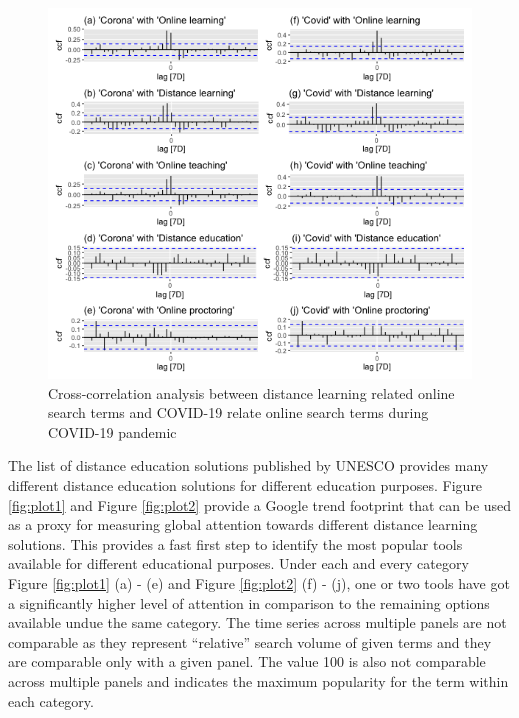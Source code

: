\documentclass[11pt,a4paper,]{article}
\begin{document}
\begin{figure}[h]

{\centering \includegraphics[width=1\textwidth]{figure/ccfAnalysis-1} 

}

\caption{Cross-correlation analysis between distance learning related online search terms and COVID-19 relate online search terms during COVID-19 pandemic}\label{fig:ccfAnalysis}
\end{figure}

The list of distance education solutions published by UNESCO provides many different distance education solutions for different education purposes. Figure \ref{fig:plot1} and Figure \ref{fig:plot2} provide a Google trend footprint that can be used as a proxy for measuring global attention towards different distance learning solutions. This provides a fast first step to identify the most popular tools available for different educational purposes. Under each and every category Figure \ref{fig:plot1} (a) - (e) and Figure \ref{fig:plot2} (f) - (j), one or two tools have got a significantly higher level of attention in comparison to the remaining options available undue the same category. The time series across multiple panels are not comparable as they represent ``relative'' search volume of given terms and they are comparable only with a given panel. The value 100 is also not comparable across multiple panels and indicates the maximum popularity for the term within each category.
\end{document}
